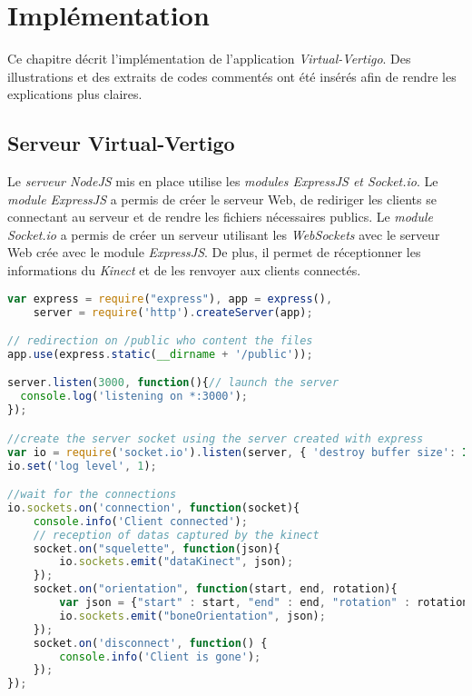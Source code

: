 \chapter{Implémentation} \label{implementation}
Ce chapitre décrit l'implémentation de l'application \textit{Virtual-Vertigo}. Des illustrations et des extraits de codes commentés ont été insérés afin de rendre les explications plus claires.


\section{Serveur Virtual-Vertigo}   \label{serveur2}
Le \textit{serveur NodeJS} mis en place utilise les \textit{modules ExpressJS et Socket.io}. Le \textit{module ExpressJS} a permis de créer le serveur Web, de rediriger les clients se connectant au serveur et de rendre les fichiers nécessaires publics. Le \textit{module Socket.io} a permis de créer un serveur utilisant les \textit{WebSockets} avec le serveur Web crée avec le module \textit{ExpressJS}. De plus, il permet de réceptionner les informations du \textit{Kinect} et de les renvoyer aux clients connectés. 

\lstset{style=mystyle} 
\begin{lstlisting}[language=JavaScript]
var express = require("express"), app = express(),
	server = require('http').createServer(app);

// redirection on /public who content the files 
app.use(express.static(__dirname + '/public'));

server.listen(3000, function(){// launch the server
  console.log('listening on *:3000');
});

//create the server socket using the server created with express
var io = require('socket.io').listen(server, { 'destroy buffer size': Infinity });
io.set('log level', 1);

//wait for the connections
io.sockets.on('connection', function(socket){
	console.info('Client connected');	
	// reception of datas captured by the kinect
	socket.on("squelette", function(json){
		io.sockets.emit("dataKinect", json);
	});
	socket.on("orientation", function(start, end, rotation){
		var json = {"start" : start, "end" : end, "rotation" : rotation };
		io.sockets.emit("boneOrientation", json);
	});
	socket.on('disconnect', function() {
		console.info('Client is gone');
	});
});
\end{lstlisting}

